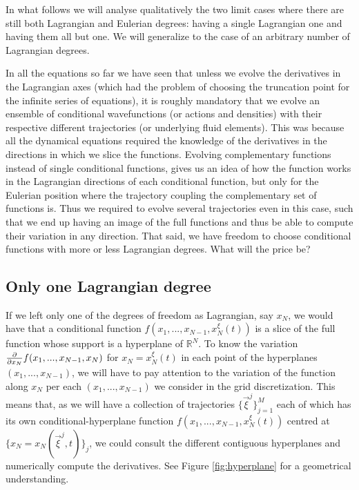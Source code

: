 \documentclass[11pt, a4paper]{article} %
\newcommand{\R}{\mathbb{R}} %
\begin{document}
In what follows we will analyse qualitatively the two limit cases where there are still both Lagrangian and Eulerian degrees: having a single Lagrangian one and having them all but one. We will generalize to the case of an arbitrary number of Lagrangian degrees.

In all the equations so far we have seen that unless we evolve the derivatives in the Lagrangian axes (which had the problem of choosing the truncation point for the infinite series of equations), it is roughly mandatory that we evolve an ensemble of conditional wavefunctions (or actions and densities) with their respective different trajectories (or underlying fluid elements). This was because all the dynamical equations required the knowledge of the derivatives in the directions in which we slice the functions. Evolving complementary functions instead of single conditional functions, gives us an idea of how the function works in the Lagrangian directions of each conditional function, but only for the Eulerian position where the trajectory coupling the complementary set of functions is. Thus we required to evolve several trajectories even in this case, such that we end up having an image of the full functions and thus be able to compute their variation in any direction. That said, we have freedom to choose conditional functions with more or less Lagrangian degrees. What will the price be?

\subsection*{Only one Lagrangian degree}
If we left only one of the degrees of freedom as Lagrangian, say $x_N$, we would have that a conditional function $f(x_1,...,x_{N-1},x_N^\xi(t))$ is a slice of the full function whose support is a hyperplane of $\R^N$. To know the variation $\pdv{}{x_N}f(x_1,...,x_{N-1},x_N)$ for $x_N=x_N^\xi(t)$ in each point of the hyperplanes $(x_1,...,x_{N-1})$, we will have to pay attention to the variation of the function along $x_N$ per each $(x_1,...,x_{N-1})$ we consider in the grid discretization. This means that, as we will have a collection of trajectories $\{\vec{\xi}^j\}_{j=1}^M$ each of which has its own conditional-hyperplane function $f(x_1,...,x_{N-1},x_N^\xi(t))$ centred at $\{x_N=x_N(\vec{\xi}^j,t)\}_j$, we could consult the different contiguous hyperplanes and numerically compute the derivatives. See Figure \ref{fig:hyperplane} for a geometrical understanding.
\end{document}
